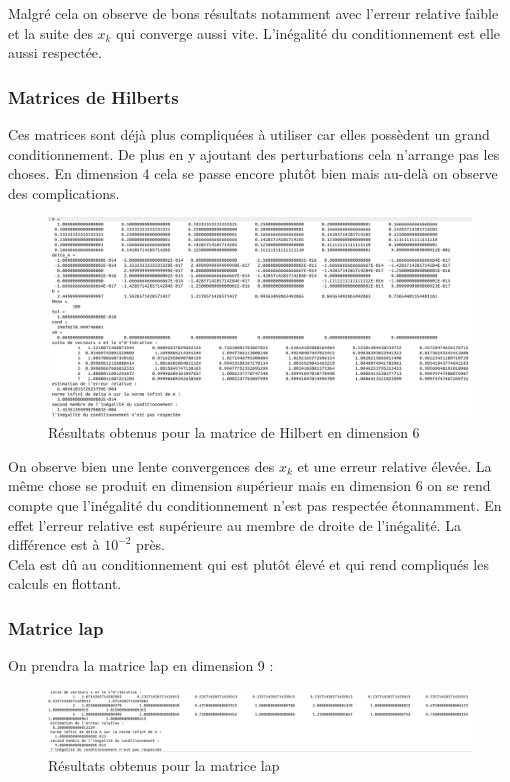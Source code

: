 \documentclass[12,french]{report}
\begin{document}
Malgré cela on observe de bons résultats notamment avec l'erreur relative faible et la suite des $x_{k}$ qui converge aussi vite. L'inégalité du conditionnement est elle aussi respectée.

\subsubsection{Matrices de Hilberts}

Ces matrices sont déjà plus compliquées à utiliser car elles possèdent un grand conditionnement. De plus en y ajoutant des perturbations cela n'arrange pas les choses. En dimension 4 cela se passe encore plutôt bien mais au-delà on observe des complications.

\begin{figure}[H]
	\centering
	\includegraphics[width=1\textwidth]{./Images/H_6_1.res}
	\caption{Résultats obtenus pour la matrice de Hilbert en dimension 6 }
\end{figure}

On observe bien une lente convergences des $x_{k}$ et une erreur relative élevée. La même chose se produit en dimension supérieur mais en dimension 6 on se rend compte que l'inégalité du conditionnement n'est pas respectée étonnamment. En effet l'erreur relative est supérieure au membre de droite de l'inégalité. La différence est à $10^{-2}$ près.\\
Cela est dû au conditionnement qui est plutôt élevé et qui rend compliqués les calculs en flottant.

\subsubsection{Matrice lap} 

On prendra la matrice lap en dimension 9 :\\

\begin{figure}[H]
	\centering
	\includegraphics[width=1\textwidth]{./Images/lap_1.res}
	\caption{Résultats obtenus pour la matrice lap}
\end{figure}
\end{document}
